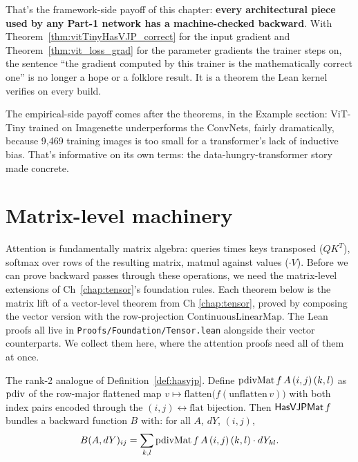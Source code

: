 
That's the framework-side payoff of this chapter: \textbf{every
architectural piece used by any Part-1 network has a machine-checked
backward}. With Theorem~\ref{thm:vitTinyHasVJP_correct} for the input
gradient and Theorem~\ref{thm:vit_loss_grad} for the parameter gradients
the trainer steps on, the sentence ``the gradient computed by this
trainer is the mathematically correct one'' is no longer a hope or a
folklore result. It is a theorem the Lean kernel verifies on every
build.

The empirical-side payoff comes after the theorems, in the Example
section: ViT-Tiny trained on Imagenette underperforms the
ConvNets, fairly dramatically, because 9{,}469 training images is
too small for a transformer's lack of inductive bias. That's
informative on its own terms: the data-hungry-transformer story
made concrete.

\section{Matrix-level machinery}
\label{sec:matrix_machinery}



Attention is fundamentally matrix algebra: queries times keys
transposed (\(QK^T\)), softmax over rows of the resulting matrix,
matmul against values (\(\cdot V\)). Before we can prove backward
passes through these operations, we need the matrix-level
extensions of Ch~\ref{chap:tensor}'s foundation rules. Each theorem
below is the matrix lift of a vector-level theorem from Ch
\ref{chap:tensor}, proved by composing the vector version with the
row-projection \(\mathrm{ContinuousLinearMap}\). The Lean proofs all
live in \texttt{Proofs/Foundation/Tensor.lean} alongside their vector
counterparts. We collect them here, where the attention proofs need
all of them at once.

\begin{definition}
  \label{def:hasvjpmat}
  \leanok
  The rank-2 analogue of Definition~\ref{def:hasvjp}. Define
  \(\operatorname{pdivMat} f\, A\, (i,j)\, (k,l)\) as \(\operatorname{pdiv}\) of the row-major
  flattened map
  \(v \mapsto \mathrm{flatten}\bigl(f(\mathrm{unflatten}\, v)\bigr)\)
  with both index pairs encoded through the
  \((i, j) \leftrightarrow \text{flat}\) bijection. Then
  \(\mathsf{HasVJPMat}\, f\) bundles a backward function \(B\) with: for all
  \(A\), \(dY\), \((i, j)\),
  \[
    B(A, dY)_{ij}
      = \sum_{k, l} \operatorname{pdivMat} f\, A\, (i,j)\, (k,l) \cdot dY_{kl}.
  \]
\end{definition}

